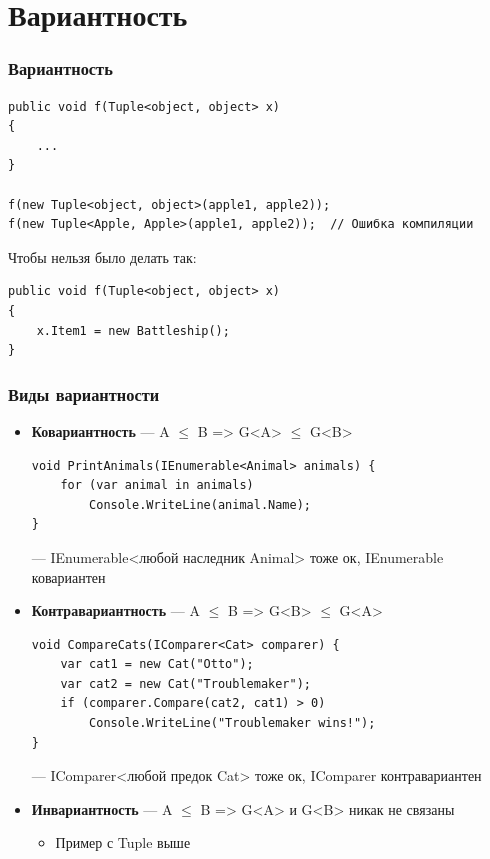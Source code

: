 \documentclass{../../slides-style}
\begin{document}
    \section{Вариантность}

    \begin{frame}[fragile]
        \frametitle{Вариантность}
        \begin{verbatim}
public void f(Tuple<object, object> x)
{
    ...
}

f(new Tuple<object, object>(apple1, apple2));
f(new Tuple<Apple, Apple>(apple1, apple2));  // Ошибка компиляции
        \end{verbatim}
        \vspace{3mm}
        Чтобы нельзя было делать так:
        \begin{verbatim}
public void f(Tuple<object, object> x)
{
    x.Item1 = new Battleship();
}
        \end{verbatim}
    \end{frame}

        \begin{frame}[fragile]
        \frametitle{Виды вариантности}
        \begin{footnotesize}
            \begin{itemize}
                \item \textbf{Ковариантность} --- A $\leq$ B => G<A> $\leq$ G<B>
                \begin{verbatim}
void PrintAnimals(IEnumerable<Animal> animals) {
    for (var animal in animals)
        Console.WriteLine(animal.Name);
}
                \end{verbatim}
                --- IEnumerable<любой наследник Animal> тоже ок, IEnumerable ковариантен
                \item \textbf{Контравариантность} --- A $\leq$ B => G<B> $\leq$ G<A>
                \begin{verbatim}
void CompareCats(IComparer<Cat> comparer) {
    var cat1 = new Cat("Otto");
    var cat2 = new Cat("Troublemaker");
    if (comparer.Compare(cat2, cat1) > 0) 
        Console.WriteLine("Troublemaker wins!");
}
                \end{verbatim}
                --- IComparer<любой предок Cat> тоже ок, IComparer контравариантен
                \item \textbf{Инвариантность} --- A $\leq$ B => G<A> и G<B> никак не связаны
                \begin{itemize}
                    \item Пример с Tuple выше
                \end{itemize}
            \end{itemize}
        \end{footnotesize}
    \end{frame}
\end{document}
